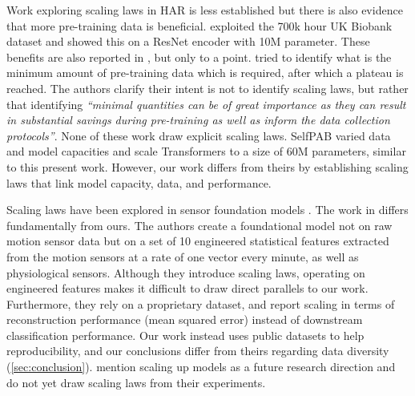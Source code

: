 Work exploring scaling laws in HAR is less established but there is also evidence that more pre-training data is beneficial. 
\cite{SSLUKbiobank} exploited the 700k hour UK Biobank dataset and showed this on a ResNet encoder with 10M parameter.
These benefits are also reported in \cite{assessingSSLHAR22}, but only to a point. 
\cite{howmuchdataSSLHAR23} tried to identify what is the minimum amount of pre-training data which is required, after which a plateau is reached. The authors clarify their intent is not to identify scaling laws, but rather that identifying {\em ``minimal quantities can be of great importance as they can result in substantial savings during pre-training as well
as inform the data collection protocols''}.
None of these work draw explicit scaling laws.
SelfPAB \cite{selfpab} \cite{monoselfpab} varied data and model capacities and scale Transformers to a size of 60M parameters, similar to this present work. However, our work differs from theirs by establishing scaling laws that link model capacity, data, and performance.


Scaling laws have been explored in sensor foundation models \cite{narayanswamy2024scalingwearablefoundationmodels,Shapiro24}. 
The work in \cite{narayanswamy2024scalingwearablefoundationmodels} differs fundamentally from ours.
The authors create a foundational model not on raw motion sensor data but on a set of 10 engineered statistical features extracted from the motion sensors at a rate of one vector every minute, as well as physiological sensors. 
Although they introduce scaling laws, operating on engineered features makes it difficult to draw direct parallels to our work.
Furthermore, they rely on a proprietary dataset, and report scaling in terms of reconstruction performance (mean squared error) instead of downstream classification performance. 
Our work instead uses public datasets to help reproducibility, and our conclusions differ from theirs regarding data diversity (\cref{sec:conclusion}).
\cite{Shapiro24}  mention scaling up models as a future research direction and do not yet draw scaling laws from their experiments.

